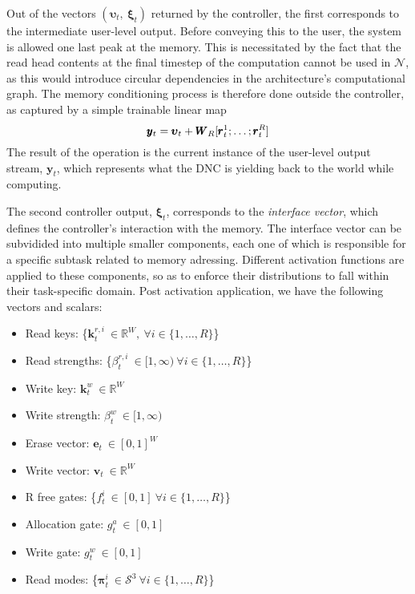 \documentclass[]{article}
\begin{document}
Out of the vectors $(\pmb{\upsilon}_t,\ \pmb{\xi}_t)$ returned by the controller, the first corresponds to the intermediate user-level output. Before conveying this to the user, the system is allowed one last peak at the memory. This is necessitated by the fact that the read head contents at the final timestep of the computation cannot be used in $\mathcal{N}$, as this would introduce circular dependencies in the architecture's computational graph. The memory conditioning process is therefore done outside the controller, as captured by a simple trainable linear map \begin{equation}
\notag
\pmb{y}_t = \pmb{\upsilon}_t + \pmb{W}_R[\pmb{r}_{t}^1;\dots;\pmb{r}_{t}^R]
\label{eqn:Memory Conditioning}
\end{equation}
The result of the operation is the current instance of the user-level output stream, $\pmb{y}_t$, which represents what the DNC is yielding back to the world while computing. 

The second controller output, $\pmb{\xi}_t$, corresponds to the \textit{interface vector}, which defines the controller's interaction with the memory. The interface vector can be subvidided into multiple smaller components, each one of which is responsible for a specific subtask related to memory adressing. Different activation functions are applied to these components, so as to enforce their distributions to fall within their task-specific domain. Post activation application, we have the following vectors and scalars:

\vspace{10pt}
\hspace{-40pt}
\begin{minipage}{0.6\textwidth}
\begin{itemize}
\item Read keys: \{$\pmb{k}_t^{r,i} \ \in \mathbb{R}^W, \ \forall i \in \{1,\dots,R\}$\}
\item Read strengths: \{$\beta_t^{r,i} \ \in [1, \infty) \ \forall i \in \{1,\dots,R\}$\}
\item Write key: $\pmb{k}_t^w \ \in \mathbb{R}^W$
\item Write strength: $\beta_t^w \ \in [1, \infty)$
\item Erase vector: $\pmb{e}_t \ \in [0,1]^W$
\end{itemize}
\end{minipage}
\hspace{-20pt}
\begin{minipage}{0.5\textwidth}
\begin{itemize}
\item Write vector: $\pmb{v}_t \ \in \mathbb{R}^W$
\item R free gates: \{$f_t^i \ \in [0,1] \ \forall i \in \{1,\dots,R\}$\}
\item Allocation gate: $g_t^a \ \in [0,1]$
\item Write gate: $g_t^w \ \in [0,1]$
\item Read modes: \{$\pmb{\pi}_t^i \ \in \mathcal{S}^3 \ \forall i \in \{1,\dots,R\}$\}
\end{itemize}
\end{minipage}
\vspace{10pt}
\end{document}
